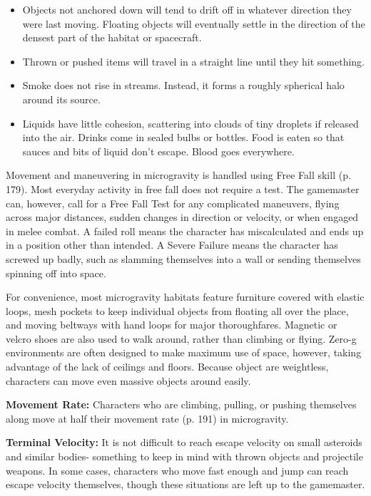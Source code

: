 \begin{itemize} \item Objects not anchored down will tend to drift off in whatever direction they were last moving. Floating objects will eventually settle in the direction of the densest part of the habitat or spacecraft. \item Thrown or pushed items will travel in a straight line until they hit something. \item Smoke does not rise in streams. Instead, it forms a roughly spherical halo around its source. \item Liquids have little cohesion, scattering into clouds of tiny droplets if released into the air. Drinks come in sealed bulbs or bottles. Food is eaten so that sauces and bits of liquid don’t escape. Blood goes everywhere. \end{itemize} 

Movement and maneuvering in microgravity is handled using Free Fall skill (p. 179). Most everyday activity in free fall does not require a test. The gamemaster can, however, call for a Free Fall Test for any complicated maneuvers, flying across major distances, sudden changes in direction or velocity, or when engaged in melee combat. A failed roll means the character has miscalculated and ends up in a position other than intended. A Severe Failure means the character has screwed up badly, such as slamming themselves into a wall or sending themselves spinning off into space. 

For convenience, most microgravity habitats feature furniture covered with elastic loops, mesh pockets to keep individual objects from floating all over the place, and moving beltways with hand loops for major thoroughfares. Magnetic or velcro shoes are also used to walk around, rather than climbing or flying. Zero-g environments are often designed to make maximum use of space, however, taking advantage of the lack of ceilings and floors. Because object are weightless, characters can move even massive objects around easily. 

\textbf{Movement Rate:} Characters who are climbing, pulling, or pushing themselves along move at half their movement rate (p. 191) in microgravity. 

\textbf{Terminal Velocity:} It is not difficult to reach escape velocity on small asteroids and similar bodies- something to keep in mind with thrown objects and projectile weapons. In some cases, characters who move fast enough and jump can reach escape velocity themselves, though these situations are left up to the gamemaster. 

